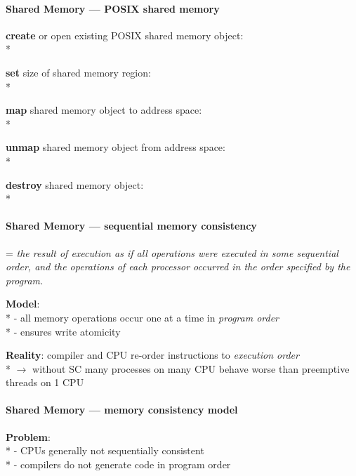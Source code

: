 \paragraph{Shared Memory --- POSIX shared memory}
\begin{items}
  \item \textbf{create} or open existing POSIX shared memory object: \\*
  \item \textbf{set} size of shared memory region: \\*
  \item \textbf{map} shared memory object to address space: \\*
  \item \textbf{unmap} shared memory object from address space: \\*
  \item \textbf{destroy} shared memory object: \\*
\end{items}

\paragraph{Shared Memory --- sequential memory consistency}
\begin{items}
  \item = \emph{the result of execution as if all operations were executed in some sequential order, and the operations of each processor occurred in the order specified by the program.}
  \item \textbf{Model}: \\*
    - all memory operations occur one at a time in \emph{program order} \\*
    - ensures write atomicity
  \item \textbf{Reality}: compiler and CPU re-order instructions to \emph{execution order} \\*
    \( \to \) without SC many processes on many CPU behave worse than preemptive threads on 1 CPU
\end{items}

\paragraph{Shared Memory --- memory consistency model}
\begin{items}
  \item \textbf{Problem}: \\*
    - CPUs generally not sequentially consistent \\*
    - compilers do not generate code in program order
\end{items}

